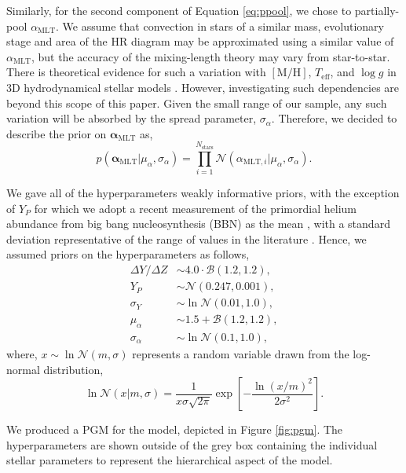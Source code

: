 \documentclass[fleqn,usenatbib]{mnras}
\newcommand{\metallicity}{\ensuremath{[\mathrm{M}/\mathrm{H}]}}
\newcommand{\teff}{\ensuremath{T_\mathrm{eff}}}
\newcommand{\mlt}{\ensuremath{{\alpha_\mathrm{MLT}}}}
\begin{document}
Similarly, for the second component of Equation \ref{eq:ppool}, we chose to partially-pool $\mlt$. We assume that convection in stars of a similar mass, evolutionary stage and area of the HR diagram may be approximated using a similar value of $\mlt$, but the accuracy of the mixing-length theory may vary from star-to-star. There is theoretical evidence for such a variation with $\metallicity$, $\teff$, and $\log{g}$ in 3D hydrodynamical stellar models \citep{Magic.Weiss.ea2015,Viani.Basu.ea2018}. However, investigating such dependencies are beyond this scope of this paper. Given the small range of our sample, any such variation will be absorbed by the spread parameter, $\sigma_\alpha$. Therefore, we decided to describe the prior on $\boldsymbol{\alpha}_\mathrm{MLT}$ as,
%
\begin{equation}
    p(\boldsymbol{\alpha}_{\mathrm{MLT}} | \mu_\alpha, \sigma_\alpha) = \prod_{i=1}^{N_\mathrm{stars}} \mathcal{N}({\alpha}_{\mathrm{MLT}, i} | \mu_\alpha, \sigma_\alpha).
\end{equation}
%

We gave all of the hyperparameters weakly informative priors, with the exception of $Y_P$ for which we adopt a recent measurement of the primordial helium abundance from big bang nucleosynthesis (BBN) as the mean \citep{Pitrou.Coc.ea2018}, with a standard deviation representative of the range of values in the literature \citep{Aver.Olive.ea2015, Peimbert.Peimbert.ea2016, Cooke.Fumagalli2018}. Hence, we assumed priors on the hyperparameters as follows,
%
\begin{align*}
    {\Delta Y}/{\Delta Z} &\sim 4.0\cdot\mathcal{B}(1.2, 1.2),\\
    Y_P &\sim \mathcal{N}(0.247, 0.001),\\
    \sigma_Y &\sim \ln\mathcal{N}(0.01, 1.0),\\
    \mu_\alpha &\sim 1.5 + \mathcal{B}(1.2, 1.2),\\
    \sigma_\alpha &\sim \ln\mathcal{N}(0.1, 1.0),
\end{align*}
%
where, $x \sim \ln\mathcal{N}(m, \sigma)$ represents a random variable drawn from the log-normal distribution,
%
\begin{equation}
    \ln\mathcal{N}(x | m, \sigma)=  \frac{1}{x \sigma \sqrt{2 \pi}} \exp \left[ - \frac{\ln (x / m)^{2}}{2 \sigma^{2}}\right].
\end{equation}
%

We produced a PGM for the model, depicted in Figure \ref{fig:pgm}. The hyperparameters are shown outside of the grey box containing the individual stellar parameters to represent the hierarchical aspect of the model.
\end{document}
